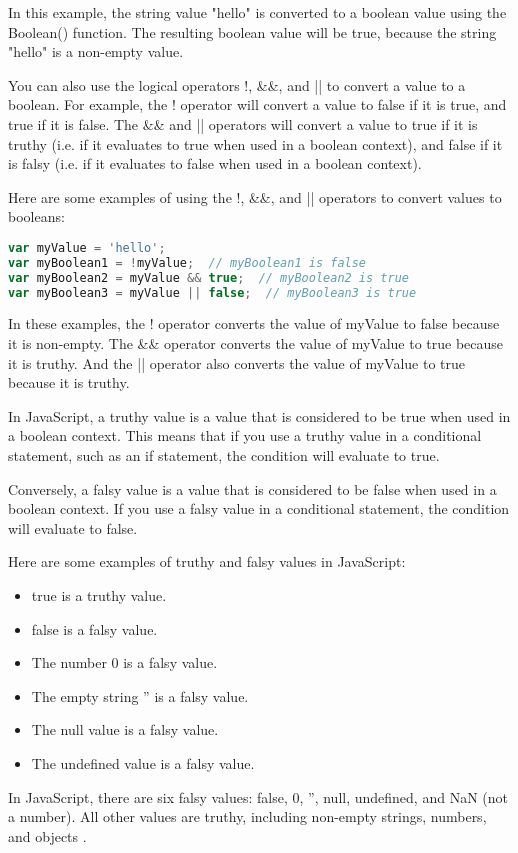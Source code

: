 {In this example, the string value "hello" is converted to a boolean value using the Boolean() function. The resulting boolean value will be true, because the string "hello" is a non-empty value.

You can also use the logical operators !, \&\&, and || to convert a value to a boolean. For example, the ! operator will convert a value to false if it is true, and true if it is false. The \&\& and || operators will convert a value to true if it is truthy (i.e. if it evaluates to true when used in a boolean context), and false if it is falsy (i.e. if it evaluates to false when used in a boolean context).

Here are some examples of using the !, \&\&, and || operators to convert values to booleans:

\begin{lstlisting}[language=Javascript, caption=Boolean validation]
var myValue = 'hello';
var myBoolean1 = !myValue;  // myBoolean1 is false
var myBoolean2 = myValue && true;  // myBoolean2 is true
var myBoolean3 = myValue || false;  // myBoolean3 is true
\end{lstlisting}

In these examples, the ! operator converts the value of myValue to false because it is non-empty. The \&\& operator converts the value of myValue to true because it is truthy. And the || operator also converts the value of myValue to true because it is truthy.

In JavaScript, a truthy value is a value that is considered to be true when used in a boolean context. This means that if you use a truthy value in a conditional statement, such as an if statement, the condition will evaluate to true.

Conversely, a falsy value is a value that is considered to be false when used in a boolean context. If you use a falsy value in a conditional statement, the condition will evaluate to false.

Here are some examples of truthy and falsy values in JavaScript:
\begin{itemize}
\item true is a truthy value.
\item false is a falsy value.
\item The number 0 is a falsy value.
\item The empty string '' is a falsy value.
\item The null value is a falsy value.
\item The undefined value is a falsy value.
\end{itemize}
In JavaScript, there are six falsy values: false, 0, '', null, undefined, and NaN (not a number). All other values are truthy, including non-empty strings, numbers, and objects \cite{falsyValues}.

}
